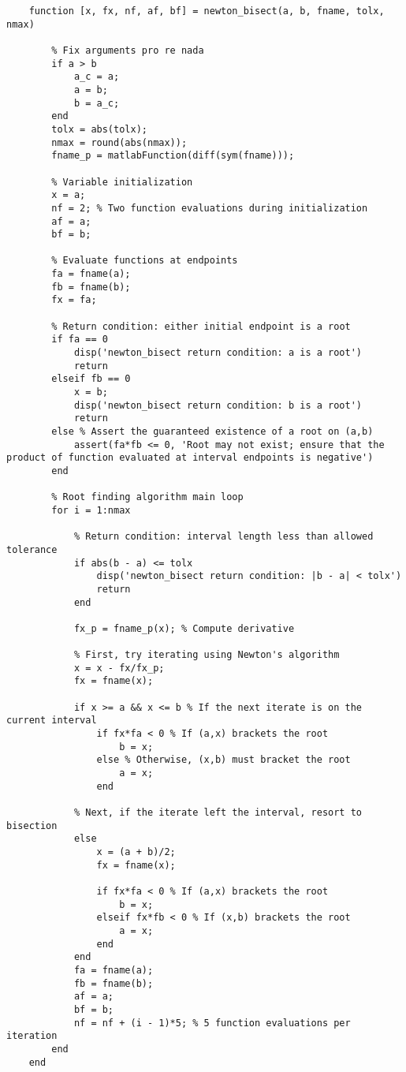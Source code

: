 \documentclass[11pt, letterpaper]{article}
\begin{document}
\begin{verbatim}
    function [x, fx, nf, af, bf] = newton_bisect(a, b, fname, tolx, nmax)

        % Fix arguments pro re nada
        if a > b
            a_c = a;
            a = b;
            b = a_c;
        end
        tolx = abs(tolx);
        nmax = round(abs(nmax));
        fname_p = matlabFunction(diff(sym(fname)));
        
        % Variable initialization
        x = a;
        nf = 2; % Two function evaluations during initialization
        af = a;
        bf = b;

        % Evaluate functions at endpoints  
        fa = fname(a);
        fb = fname(b);
        fx = fa;
        
        % Return condition: either initial endpoint is a root
        if fa == 0 
            disp('newton_bisect return condition: a is a root')
            return
        elseif fb == 0 
            x = b;
            disp('newton_bisect return condition: b is a root')
            return
        else % Assert the guaranteed existence of a root on (a,b)
            assert(fa*fb <= 0, 'Root may not exist; ensure that the product of function evaluated at interval endpoints is negative')
        end
        
        % Root finding algorithm main loop
        for i = 1:nmax
        
            % Return condition: interval length less than allowed tolerance
            if abs(b - a) <= tolx
                disp('newton_bisect return condition: |b - a| < tolx')
                return
            end
            
            fx_p = fname_p(x); % Compute derivative
            
            % First, try iterating using Newton's algorithm
            x = x - fx/fx_p; 
            fx = fname(x); 
            
            if x >= a && x <= b % If the next iterate is on the current interval
                if fx*fa < 0 % If (a,x) brackets the root
                    b = x; 
                else % Otherwise, (x,b) must bracket the root
                    a = x;
                end
            
            % Next, if the iterate left the interval, resort to bisection
            else 
                x = (a + b)/2;
                fx = fname(x);
                
                if fx*fa < 0 % If (a,x) brackets the root
                    b = x;
                elseif fx*fb < 0 % If (x,b) brackets the root
                    a = x;
                end
            end
            fa = fname(a);
            fb = fname(b);
            af = a;
            bf = b;
            nf = nf + (i - 1)*5; % 5 function evaluations per iteration
        end
    end
\end{verbatim}
\end{document}
